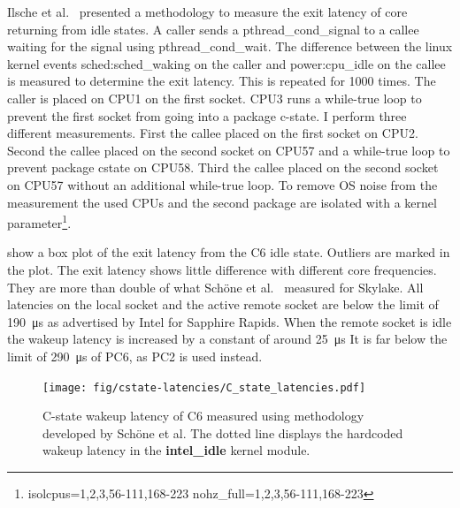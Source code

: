 Ilsche et al.~\cite{Ilsche_2018_cstate} presented a methodology to measure the exit latency of core returning from idle states.
A caller sends a pthread\_cond\_signal to a callee waiting for the signal using pthread\_cond\_wait.
The difference between the linux kernel events sched:sched\_waking on the caller and power:cpu\_idle on the callee is measured to determine the exit latency.
This is repeated for \SI{1000}{} times.
The caller is placed on CPU1 on the first socket.
CPU3 runs a while-true loop to prevent the first socket from going into a package c-state.
I perform three different measurements.
First the callee placed on the first socket on CPU2.
Second the callee placed on the second socket on CPU57 and a while-true loop to prevent package cstate on CPU58.
Third the callee placed on the second socket on CPU57 without an additional while-true loop.
To remove OS noise from the measurement the used CPUs and the second package are isolated with a kernel parameter\footnote{isolcpus=1,2,3,56-111,168-223 nohz\_full=1,2,3,56-111,168-223}.

 show a box plot of the exit latency from the C6 idle state.
Outliers are marked in the plot.
The exit latency shows little difference with different core frequencies.
They are more than double of what Schöne et al.~\cite{Schoene_2019_SKL} measured for Skylake.
All latencies on the local socket and the active remote socket are below the limit of \SI{190}{\us} as advertised by Intel for Sapphire Rapids.
When the remote socket is idle the wakeup latency is increased by a constant of around \SI{25}{\us}
It is far below the limit of \SI{290}{\us} of PC6, as PC2 is used instead.

\begin{figure}[!ht]
    \centering
    \texttt{[image: fig/cstate-latencies/C\_state\_latencies.pdf]}
    \caption{\label{fig:c6_latencies}C-state wakeup latency of C6 measured using methodology developed by Schöne et al.
The dotted line displays the hardcoded wakeup latency in the \protect\textbf{intel\_idle} kernel module.
\protect\footnotemark}
\end{figure}
